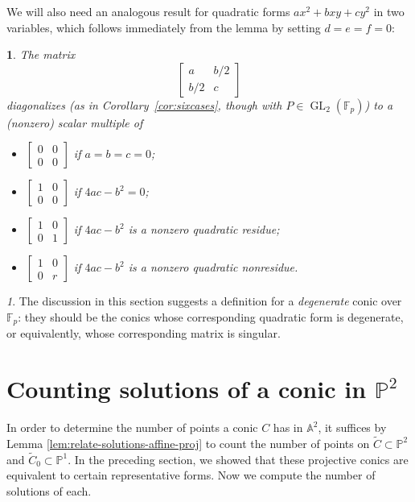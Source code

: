 \documentclass[10pt,a4paper]{amsart}
\numberwithin{equation}{section}
\numberwithin{figure}{section}
\numberwithin{table}{section}
\theoremstyle{definition}
\theoremstyle{plain}
\theoremstyle{remark}
\newtheorem*{rem*}{\protect\remarkname}
\theoremstyle{plain}
\newtheorem{cor}[thm]{\protect\corollaryname}
\theoremstyle{definition}
\theoremstyle{plain}
\theoremstyle{plain}
\providecommand{\remarkname}{Remark}
\providecommand{\corollaryname}{Corollary}
\newcommand{\A}{\mathbb{A}}
\renewcommand{\P}{\mathbb{P}}
\newcommand{\F}{\mathbb{F}}
\newcommand{\GL}{\operatorname{GL}}
\begin{document}
	We will also need an analogous result for quadratic forms $ax^2+bxy+cy^2$ in two variables, which follows immediately from the lemma by setting $d=e=f=0$:
	\begin{cor}\label{cor:diag-P1}
		The matrix
\begin{equation*}
\begin{bmatrix}a&b/2\\b/2&c\end{bmatrix}
\end{equation*}
diagonalizes (as in Corollary~\ref{cor:sixcases}, though with $P \in \GL_2(\F_p)$) to a (nonzero) scalar multiple of
		\begin{itemize}
			\item $\left[\begin{smallmatrix}0&0\\0&0\end{smallmatrix}\right]$ if $a=b=c=0$;
			\item $\left[\begin{smallmatrix}1&0\\0&0\end{smallmatrix}\right]$ if $4ac-b^2=0$;
			\item $\left[\begin{smallmatrix}1&0\\0&1\end{smallmatrix}\right]$ if $4ac-b^2$ is a nonzero quadratic residue;
			\item $\left[\begin{smallmatrix}1&0\\0&r\end{smallmatrix}\right]$ if $4ac-b^2$ is a nonzero quadratic nonresidue.
		\end{itemize}
	\end{cor}
	
	\begin{rem*}
		The discussion in this section suggests a definition for a \emph{degenerate} conic over $\F_p$: they should be the conics whose corresponding quadratic form is degenerate, or equivalently, whose corresponding matrix is singular.
	\end{rem*}
	
	\section{Counting solutions of a conic in $\P^2$}
	\label{sec:proj-solutions}
	
	In order to determine the number of points a conic $C$ has in $\A^2$, it suffices by Lemma \ref{lem:relate-solutions-affine-proj} to count the number of points on $\widetilde{C}\subset \P^2$ and $\widetilde{C}_0\subset \P^1$. In the preceding section, we showed that these projective conics are equivalent to certain representative forms. Now we compute the number of solutions of each.
	
\end{document}
